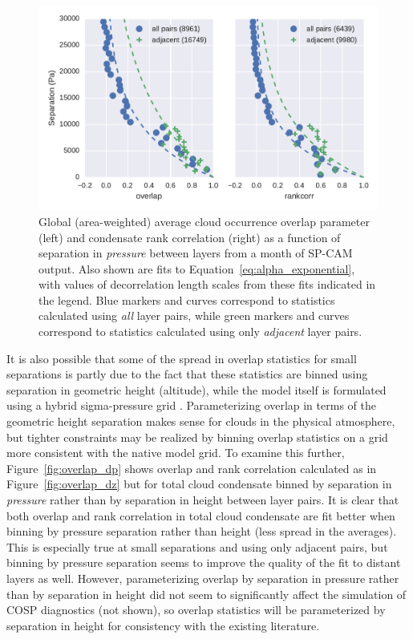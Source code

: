 \begin{figure}[htbp]
\centering
\includegraphics{graphics/subgrid2_overlap_dp.pdf}
\caption{\label{fig:overlap_dp}Global (area-weighted) average cloud
occurrence overlap parameter (left) and condensate rank correlation
(right) as a function of separation in \emph{pressure} between layers
from a month of SP-CAM output. Also shown are fits to
Equation~\ref{eq:alpha_exponential}, with values of decorrelation length
scales from these fits indicated in the legend. Blue markers and curves
correspond to statistics calculated using \emph{all} layer pairs, while
green markers and curves correspond to statistics calculated using only
\emph{adjacent} layer pairs.}\label{fig:overlapux5fdp}
\end{figure}

It is also possible that some of the spread in overlap statistics for
small separations is partly due to the fact that these statistics are
binned using separation in geometric height (altitude), while the model
itself is formulated using a hybrid sigma-pressure grid \citep[the CRM
uses the lowest 24 levels of
CAM;][]{marchand_et_al_2009, collins_et_al_2004}. Parameterizing overlap
in terms of the geometric height separation makes sense for clouds in
the physical atmosphere, but tighter constraints may be realized by
binning overlap statistics on a grid more consistent with the native
model grid. To examine this further, Figure~\ref{fig:overlap_dp} shows
overlap and rank correlation calculated as in
Figure~\ref{fig:overlap_dz} but for total cloud condensate binned by
separation in \emph{pressure} rather than by separation in height
between layer pairs. It is clear that both overlap and rank correlation
in total cloud condensate are fit better when binning by pressure
separation rather than height (less spread in the averages). This is
especially true at small separations and using only adjacent pairs, but
binning by pressure separation seems to improve the quality of the fit
to distant layers as well. However, parameterizing overlap by separation
in pressure rather than by separation in height did not seem to
significantly affect the simulation of COSP diagnostics (not shown), so
overlap statistics will be parameterized by separation in height for
consistency with the existing literature.

